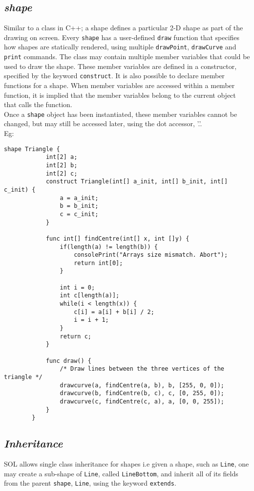 \documentclass[letterpaper,12pt]{article}
\begin{document}
\subsection{\textit{shape}}
Similar to a class in C++; a shape defines a particular 2-D shape as part of the drawing on screen. Every \texttt{shape} has a user-defined \texttt{draw} function that specifies how shapes are statically rendered, using multiple \texttt{drawPoint}, \texttt{drawCurve} and \texttt{print} commands. The class may contain multiple member variables that could be used to draw the shape. These member variables are defined in a constructor, specified by the keyword \texttt{construct}. It is also possible to declare member functions for a shape. When member variables are accessed within a member function, it is implied that the member variables belong to the current object that calls the function.\\
Once a \texttt{shape} object has been instantiated, these member variables cannot be changed, but may still be accessed later, using the dot accessor, '.'.\\
Eg: \begin{lstlisting}[aboveskip=-13pt]
        shape Triangle {
            int[2] a;
            int[2] b;
            int[2] c;
            construct Triangle(int[] a_init, int[] b_init, int[] c_init) {
                a = a_init;
                b = b_init;
                c = c_init;
            }
        
            func int[] findCentre(int[] x, int []y) {
                if(length(a) != length(b)) {
                    consolePrint("Arrays size mismatch. Abort");
                    return int[0];
                }
            
                int i = 0;
                int c[length(a)];
                while(i < length(x)) {
                    c[i] = a[i] + b[i] / 2;
                    i = i + 1;
                }
                return c;
            }

            func draw() {
                /* Draw lines between the three vertices of the triangle */
                drawcurve(a, findCentre(a, b), b, [255, 0, 0]);
                drawcurve(b, findCentre(b, c), c, [0, 255, 0]);
                drawcurve(c, findCentre(c, a), a, [0, 0, 255]);
            }
        }
    \end{lstlisting}

\subsection{\textit{Inheritance}}
SOL allows single class inheritance for shapes i.e given a shape, such as \texttt{Line}, one may create a sub-shape of \texttt{Line}, called \texttt{LineBottom}, and inherit all of its fields from the parent \texttt{shape}, \texttt{Line}, using the keyword \texttt{extends}.\\
\end{document}
